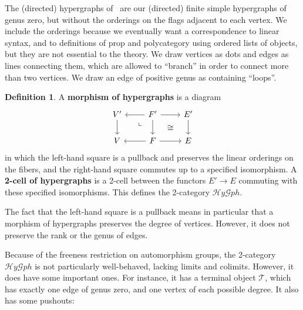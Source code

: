 \documentclass{article}
\theoremstyle{definition}
\newtheorem{defn}[thm]{Definition}
\theoremstyle{remark}
\newcommand{\dlpullback}[1][dl]{\ar[#1,phantom,near start,"\llcorner"]}
\def\hy{\mathcal{H}\mathit{y}\mathcal{G}\mathit{ph}}
\def\thy{\mathcal{T}}
\begin{document}
The (directed) hypergraphs of~\cite{glpn:directed-hypergraphs} are our (directed) finite simple hypergraphs of genus zero, but without the orderings on the flags adjacent to each vertex.
We include the orderings because we eventually want a correspondence to linear syntax, and to definitions of prop and polycategory using ordered lists of objects, but they are not essential to the theory.
We draw vertices as dots and edges as lines connecting them, which are allowed to ``branch'' in order to connect more than two vertices.
We draw an edge of positive genus as containing ``loops''.

\begin{defn}
  A \textbf{morphism of hypergraphs} is a diagram
  \[
  \begin{tikzcd}
    V' \ar[d] & F' \ar[d] \ar[r] \ar[l] \dlpullback[dl] \ar[dr,phantom,"\cong"] & E' \ar[d]\\
    V  & F \ar[r] \ar[l] & E
  \end{tikzcd}
  \]
  in which the left-hand square is a pullback and preserves the linear orderings on the fibers, and the right-hand square commutes up to a specified isomorphism.
  A \textbf{2-cell of hypergraphs} is a 2-cell between the functors $E'\to E$ commuting with these specified isomorphisms.
  This defines the 2-category $\hy$.
\end{defn}

The fact that the left-hand square is a pullback means in particular that a morphism of hypergraphs preserves the degree of vertices.
However, it does not preserve the rank or the genus of edges.

Because of the freeness restriction on automorphism groups, the 2-category $\hy$ is not particularly well-behaved, lacking limits and colimits.
However, it does have some important ones.
For instance, it has a terminal object $\thy$, which has exactly one edge of genus zero, and one vertex of each possible degree.
It also has some pushouts:
\end{document}
